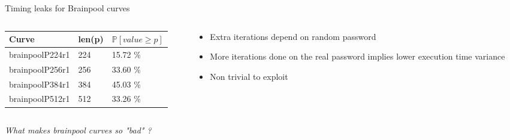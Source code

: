 \documentclass[xcolor=table]{bredelebeamer}
\begin{document}
\begin{frame}{Timing leaks for Brainpool curves}
\exampleCodeD

\begin{columns}
\begin{column}{0.6\textwidth}  %
\begin{table}[]
\begin{tabular}{@{}lll@{}}
\toprule
Curve           & len(p) & $\mathbb{P}[value \geq p]$ \\ \midrule
brainpoolP224r1 & 224    & 15.72 \%                   \\
brainpoolP256r1 & 256    & 33.60 \%                   \\
brainpoolP384r1 & 384    & 45.03 \%                   \\
brainpoolP512r1 & 512    & 33.26 \%                   \\ \bottomrule
\end{tabular}
\end{table}
\end{column}
\begin{column}{0.4\textwidth}
\begin{itemize}
    \item Extra iterations depend on random password
    \item More iterations done on the real password implies lower execution time variance
    \item Non trivial to exploit
\end{itemize}    
\end{column}
\end{columns}
\vspace{30pt}
\textit{\Large{What makes brainpool curves so "bad" ?}}
\end{frame}
\end{document}
